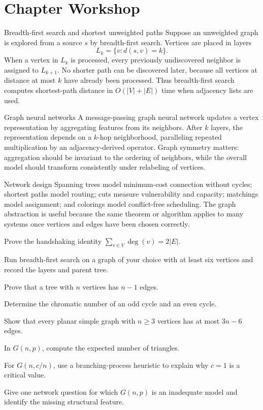 \section{Chapter Workshop}

\begin{workedexample}{Breadth-first search and shortest unweighted paths}
Suppose an unweighted graph is explored from a source $s$ by breadth-first search. Vertices are placed in layers
\[
    L_k=\{v:d(s,v)=k\}.
\]
When a vertex in $L_k$ is processed, every previously undiscovered neighbor is assigned to $L_{k+1}$. No shorter path can be discovered later, because all vertices at distance at most $k$ have already been processed. Thus breadth-first search computes shortest-path distance in $O(|V|+|E|)$ time when adjacency lists are used.
\end{workedexample}

\begin{applicationbox}{Graph neural networks}
A message-passing graph neural network updates a vertex representation by aggregating features from its neighbors. After $k$ layers, the representation depends on a $k$-hop neighborhood, paralleling repeated multiplication by an adjacency-derived operator. Graph symmetry matters: aggregation should be invariant to the ordering of neighbors, while the overall model should transform consistently under relabeling of vertices.
\end{applicationbox}

\begin{applicationbox}{Network design}
Spanning trees model minimum-cost connection without cycles; shortest paths model routing; cuts measure vulnerability and capacity; matchings model assignment; and colorings model conflict-free scheduling. The graph abstraction is useful because the same theorem or algorithm applies to many systems once vertices and edges have been chosen correctly.
\end{applicationbox}

\begin{chapterexercises}
    \item Prove the handshaking identity $\sum_{v\in V}\deg(v)=2|E|$.
    \item Run breadth-first search on a graph of your choice with at least six vertices and record the layers and parent tree.
    \item Prove that a tree with $n$ vertices has $n-1$ edges.
    \item Determine the chromatic number of an odd cycle and an even cycle.
    \item Show that every planar simple graph with $n\ge3$ vertices has at most $3n-6$ edges.
    \item In $G(n,p)$, compute the expected number of triangles.
    \item For $G(n,c/n)$, use a branching-process heuristic to explain why $c=1$ is a critical value.
    \item Give one network question for which $G(n,p)$ is an inadequate model and identify the missing structural feature.
\end{chapterexercises}

